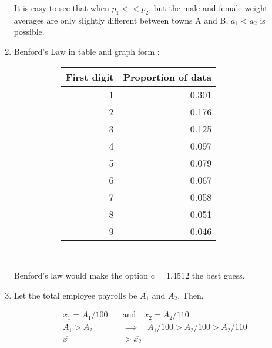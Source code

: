 \begin{enumerate}
		It is easy to see that when $ p_1 << p_2 $, but the male and female weight averages are only slightly different between towns A and B, $ a_1 < a_2 $ is possible.
		
	
	\item Benford's Law in table and graph form : 
	\begin{figure}[H]
		\begin{subfigure}[]{0.45\linewidth}
			\centering
			\begin{table}[H]
				\centering
				\begin{tabular}{@{}rr@{}}
					\toprule
					First digit &  Proportion of data \\
					\midrule
					1 &               0.301 \\
					2 &               0.176 \\
					3 &               0.125 \\
					4 &               0.097 \\
					5 &               0.079 \\
					6 &               0.067 \\
					7 &               0.058 \\
					8 &               0.051 \\
					9 &               0.046 \\
					\bottomrule
				\end{tabular}
			\end{table}
		\end{subfigure}
		\begin{subfigure}[]{0.45\linewidth}
			\centering
		\end{subfigure} \\		
	\end{figure}
	
	Benford's law would make the option c = 1.4512 the best guess.
	
	\item Let the total employee payrolls be $ A_1 $ and $ A_2 $. Then, 
	
		\begin{align}
			\overline{x_1} = A_1 / 100 \quad &\text{and} \quad \overline{x_2} = A_2 / 110 \\
			A_1 > A_2 \quad &\implies \quad A_1 / 100 > A_2 / 100 > A_2 / 110 \\
			\overline{x_1} &> \overline{x_2} 
		\end{align}
	

\end{enumerate}
